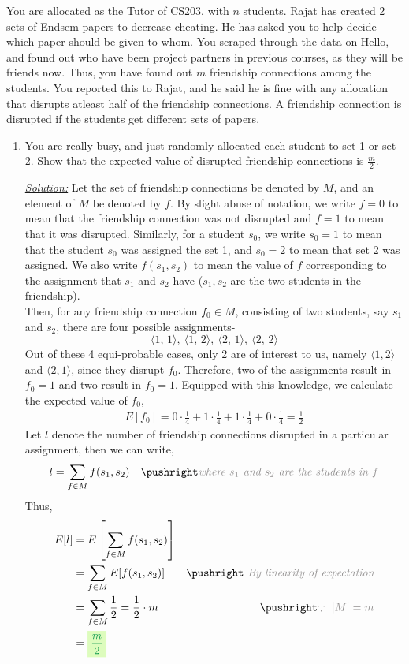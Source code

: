 \documentclass[12pt,titlepage]{report}
\begin{document}
You are allocated as the Tutor of CS203, with $n$ students. Rajat has created 2 sets of Endsem papers to decrease cheating. He has asked you to help decide which paper should be given to whom. You scraped through the data on Hello, and found out who have been project partners in previous courses, as they will be friends now. Thus, you have found out $m$ friendship connections among the students. You reported this to Rajat, and he said he is fine with any allocation that disrupts atleast half of the
friendship connections. A friendship connection is disrupted if the students get different sets of papers.
\begin{enumerate}[label=(\alph*)]
    \item You are really busy, and just randomly allocated each student to set 1 or set 2. Show that the expected value of disrupted friendship connections is $\frac{m}{2}$.
    \item[\underline{\textit{Solution:}}] Let the set of friendship connections be denoted by $M$, and an element of $M$ be denoted by $f$. By slight abuse of notation, we write $f=0$ to mean that the friendship connection was not disrupted and $f=1$ to mean that it was disrupted. Similarly, for a student $s_0$, we write $s_0=1$ to mean that the student $s_0$ was assigned the set 1, and $s_0=2$ to mean that set 2 was assigned. We also write $f(s_1, s_2)$ to mean the value of $f$ corresponding to the assignment that $s_1$ and $s_2$ have ($s_1,s_2$ are the two students in the friendship).\\
    Then, for any friendship connection $f_0\in M$, consisting of two students, say $s_1$ and $s_2$, there are four possible assignments- 
    $$\langle 1,\,1 \rangle,\ \langle 1,\,2 \rangle,\ \langle 2,\,1 \rangle,\ \langle 2,\,2 \rangle$$
    Out of these 4 equi-probable cases, only 2 are of interest to us, namely $\langle 1, 2\rangle$ and $\langle 2, 1 \rangle$, since they disrupt $f_0$. Therefore, two of the assignments result in $f_0=1$ and two result in $f_0=1$.
    Equipped with this knowledge, we calculate the expected value of $f_0$,
    \begin{align*}
        E[f_0]=0\cdot \frac{1}{4}+1\cdot \frac{1}{4}+1\cdot \frac{1}{4}+0\cdot \frac{1}{4} =\boxed{\frac{1}{2}}
    \end{align*}
    Let $l$ denote the number of friendship connections disrupted in a particular assignment, then we can write,
    \begin{align*}
        l&=\sum_{f\in M} f(s_1, s_2) \comment{\textit{where $s_1$ and $s_2$ are the students in $f$}}
    \end{align*}
    Thus,
    \begin{align*}
        E[l] &= E\left[\sum_{f\in M} f(s_1, s_2)\right] \\
        &= \sum_{f\in M} E[f(s_1,s_2)] \comment{\textit{ By linearity of expectation}} \\
        &= \sum_{f\in M} \frac{1}{2} = \frac{1}{2}\cdot m \comment{\text{$\because\ |M|=m$}} \\
        &= \ans{$\dfrac{m}{2}$}
    \end{align*}
      

\end{enumerate}
\end{document}
